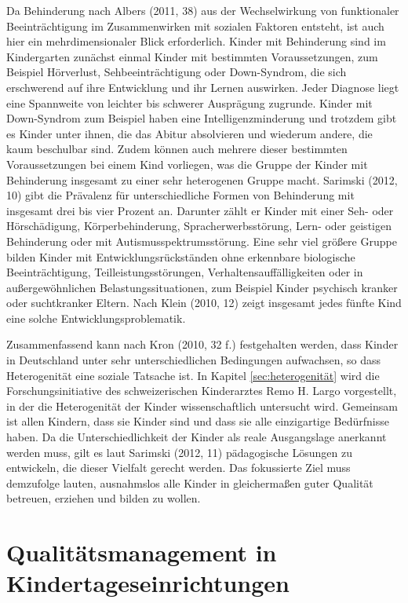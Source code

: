 Da Behinderung nach Albers (2011, 38) aus der Wechselwirkung von funktionaler Beeinträchtigung im Zusammenwirken mit sozialen Faktoren entsteht, ist auch hier ein mehrdimensionaler Blick erforderlich. Kinder mit Behinderung sind im Kindergarten zunächst einmal Kinder mit bestimmten Voraussetzungen, zum Beispiel Hörverlust, Sehbeeinträchtigung oder Down-Syndrom, die sich erschwerend auf ihre Entwicklung und ihr Lernen auswirken. Jeder Diagnose liegt eine Spannweite von leichter bis schwerer Ausprägung zugrunde. Kinder mit Down-Syndrom zum Beispiel haben eine Intelligenzminderung und trotzdem gibt es Kinder unter ihnen, die das Abitur absolvieren und wiederum andere, die kaum beschulbar sind. Zudem können auch mehrere dieser bestimmten Voraussetzungen bei einem Kind vorliegen, was die Gruppe der Kinder mit Behinderung insgesamt zu einer sehr heterogenen Gruppe macht. Sarimski (2012, 10) gibt die Prävalenz für unterschiedliche Formen von Behinderung mit insgesamt drei bis vier Prozent an. Darunter zählt er Kinder mit einer Seh- oder Hörschädigung, Körperbehinderung, Spracherwerbsstörung, Lern- oder geistigen Behinderung oder mit Autismusspektrumsstörung. 
Eine sehr viel größere Gruppe bilden Kinder mit Entwicklungsrückständen ohne erkennbare biologische Beeinträchtigung, Teilleistungsstörungen, Verhaltensauffälligkeiten oder in außergewöhnlichen Belastungssituationen, zum Beispiel Kinder psychisch kranker oder suchtkranker Eltern. Nach Klein (2010, 12) zeigt insgesamt jedes fünfte Kind eine solche Entwicklungsproblematik. 

Zusammenfassend kann nach Kron (2010, 32 f.) festgehalten werden, dass Kinder in Deutschland unter sehr unterschiedlichen Bedingungen aufwachsen, so dass Heterogenität eine soziale Tatsache ist. In Kapitel \ref{sec:heterogenität} wird die Forschungsinitiative des schweizerischen Kinderarztes Remo H. Largo vorgestellt, in der die Heterogenität der Kinder wissenschaftlich untersucht wird. 
Gemeinsam ist allen Kindern, dass sie Kinder sind und dass sie alle einzigartige Bedürfnisse haben. 
Da die Unterschiedlichkeit der Kinder als reale Ausgangslage anerkannt werden muss, gilt es laut Sarimski (2012, 11) pädagogische Lösungen zu entwickeln, die dieser Vielfalt gerecht werden. Das fokussierte Ziel muss demzufolge lauten, ausnahmslos alle Kinder in gleichermaßen guter Qualität betreuen, erziehen und bilden zu wollen.  


\section{Qualitätsmanagement in Kindertageseinrichtungen}

